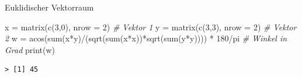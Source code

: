 \documentclass[
  8pt,
  ignorenonframetext,
]{beamer}
\newenvironment{Shaded}{\begin{snugshade}}{\end{snugshade}}
\newcommand{\AttributeTok}[1]{\textcolor[rgb]{0.77,0.63,0.00}{#1}}
\newcommand{\CommentTok}[1]{\textcolor[rgb]{0.56,0.35,0.01}{\textit{#1}}}
\newcommand{\DecValTok}[1]{\textcolor[rgb]{0.00,0.00,0.81}{#1}}
\newcommand{\FunctionTok}[1]{\textcolor[rgb]{0.00,0.00,0.00}{#1}}
\newcommand{\NormalTok}[1]{#1}
\newcommand{\OtherTok}[1]{\textcolor[rgb]{0.56,0.35,0.01}{#1}}
\newcommand{\SpecialCharTok}[1]{\textcolor[rgb]{0.00,0.00,0.00}{#1}}
\begin{document}
\begin{frame}[fragile]{Euklidischer Vektorraum}
\begin{Shaded}
\begin{Highlighting}[]
\NormalTok{x }\OtherTok{=} \FunctionTok{matrix}\NormalTok{(}\FunctionTok{c}\NormalTok{(}\DecValTok{3}\NormalTok{,}\DecValTok{0}\NormalTok{), }\AttributeTok{nrow =} \DecValTok{2}\NormalTok{)                                   }\CommentTok{\# Vektor 1}
\NormalTok{y }\OtherTok{=} \FunctionTok{matrix}\NormalTok{(}\FunctionTok{c}\NormalTok{(}\DecValTok{3}\NormalTok{,}\DecValTok{3}\NormalTok{), }\AttributeTok{nrow =} \DecValTok{2}\NormalTok{)                                   }\CommentTok{\# Vektor 2}
\NormalTok{w }\OtherTok{=} \FunctionTok{acos}\NormalTok{(}\FunctionTok{sum}\NormalTok{(x}\SpecialCharTok{*}\NormalTok{y)}\SpecialCharTok{/}\NormalTok{(}\FunctionTok{sqrt}\NormalTok{(}\FunctionTok{sum}\NormalTok{(x}\SpecialCharTok{*}\NormalTok{x))}\SpecialCharTok{*}\FunctionTok{sqrt}\NormalTok{(}\FunctionTok{sum}\NormalTok{(y}\SpecialCharTok{*}\NormalTok{y)))) }\SpecialCharTok{*} \DecValTok{180}\SpecialCharTok{/}\NormalTok{pi    }\CommentTok{\# Winkel in Grad}
\FunctionTok{print}\NormalTok{(w)}
\end{Highlighting}
\end{Shaded}

\begin{verbatim}
> [1] 45
\end{verbatim}
\end{frame}
\end{document}
